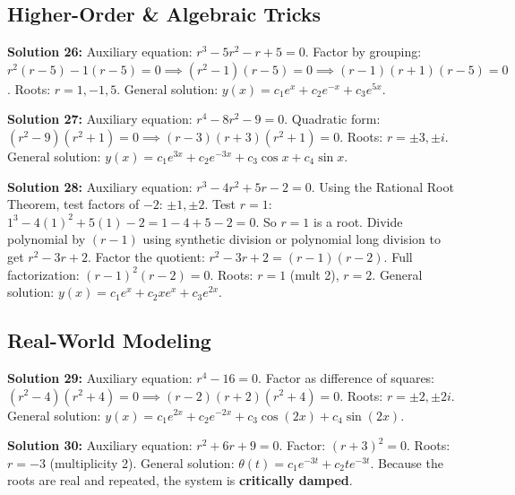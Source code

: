 \documentclass[12pt]{article}
\begin{document}
\subsection*{Higher-Order \& Algebraic Tricks}
\textbf{Solution 26:} 
Auxiliary equation: $r^3 - 5r^2 - r + 5 = 0$. 
Factor by grouping: $r^2(r-5) - 1(r-5) = 0 \implies (r^2-1)(r-5) = 0 \implies (r-1)(r+1)(r-5) = 0$. 
Roots: $r = 1, -1, 5$. 
General solution: $y(x) = c_1e^x + c_2e^{-x} + c_3e^{5x}$.

\textbf{Solution 27:} 
Auxiliary equation: $r^4 - 8r^2 - 9 = 0$. 
Quadratic form: $(r^2-9)(r^2+1) = 0 \implies (r-3)(r+3)(r^2+1) = 0$. 
Roots: $r = \pm 3, \pm i$. 
General solution: $y(x) = c_1e^{3x} + c_2e^{-3x} + c_3\cos x + c_4\sin x$.

\textbf{Solution 28:} 
Auxiliary equation: $r^3 - 4r^2 + 5r - 2 = 0$. 
Using the Rational Root Theorem, test factors of $-2$: $\pm 1, \pm 2$. 
Test $r=1$: $1^3 - 4(1)^2 + 5(1) - 2 = 1 - 4 + 5 - 2 = 0$. So $r=1$ is a root. 
Divide polynomial by $(r-1)$ using synthetic division or polynomial long division to get $r^2 - 3r + 2$. 
Factor the quotient: $r^2 - 3r + 2 = (r-1)(r-2)$. 
Full factorization: $(r-1)^2(r-2) = 0$. 
Roots: $r = 1$ (mult 2), $r = 2$. 
General solution: $y(x) = c_1e^x + c_2xe^x + c_3e^{2x}$.

\subsection*{Real-World Modeling}
\textbf{Solution 29:} 
Auxiliary equation: $r^4 - 16 = 0$. 
Factor as difference of squares: $(r^2-4)(r^2+4) = 0 \implies (r-2)(r+2)(r^2+4) = 0$. 
Roots: $r = \pm 2, \pm 2i$. 
General solution: $y(x) = c_1e^{2x} + c_2e^{-2x} + c_3\cos(2x) + c_4\sin(2x)$.

\textbf{Solution 30:} 
Auxiliary equation: $r^2 + 6r + 9 = 0$. 
Factor: $(r+3)^2 = 0$. 
Roots: $r = -3$ (multiplicity 2). 
General solution: $\theta(t) = c_1e^{-3t} + c_2te^{-3t}$. 
Because the roots are real and repeated, the system is \textbf{critically damped}.

\newpage
\end{document}
